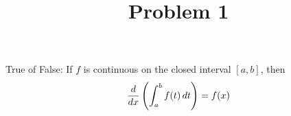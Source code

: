 \documentclass{ximera}
\title[Problem 1]{Problem 1}
\begin{document}
\begin{abstract} \end{abstract}
\maketitle

\begin{problem}
  True of False: If $f$ is continuous on the closed interval $[a,b]$,
  then
  $$\dfrac{d}{dx} \left( \int_a^b f(t) \,d t \right) = f(x)$$
  \end{problem}
\end{document}
